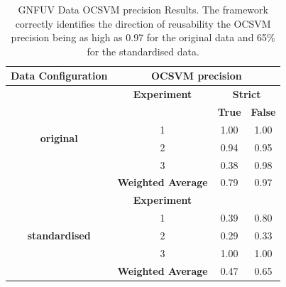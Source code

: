 \documentclass{mpaper}
\begin{document}
\begin{table}[]
\centering
\begin{tabular}{|c|ccc|}
\hline
\textbf{Data Configuration}            & \multicolumn{3}{c|}{\textbf{OCSVM precision}}                                         \\ \hline
\multirow{6}{*}{\textbf{original}}     & \multicolumn{1}{c|}{\textbf{Experiment}}       & \multicolumn{2}{c|}{\textbf{Strict}} \\ \cline{2-4} 
                                       & \multicolumn{1}{l|}{}                          & \textbf{True}    & \textbf{False}    \\ \cline{2-4} 
                                       & \multicolumn{1}{c|}{1}                         & 1.00             & 1.00              \\
                                       & \multicolumn{1}{c|}{2}                         & 0.94             & 0.95              \\
                                       & \multicolumn{1}{c|}{3}                         & 0.38             & 0.98              \\ \cline{2-4} 
                                       & \multicolumn{1}{c|}{\textbf{Weighted Average}} & 0.79             & 0.97              \\ \hline
\multirow{5}{*}{\textbf{standardised}} & \multicolumn{1}{c|}{\textbf{Experiment}}       &                  &                   \\ \cline{2-4} 
                                       & \multicolumn{1}{c|}{1}                         & 0.39             & 0.80              \\
                                       & \multicolumn{1}{c|}{2}                         & 0.29             & 0.33              \\
                                       & \multicolumn{1}{c|}{3}                         & 1.00             & 1.00              \\ \cline{2-4} 
                                       & \multicolumn{1}{c|}{\textbf{Weighted Average}} & 0.47             & 0.65              \\ \hline
\end{tabular}
\caption{\label{tab:gnfuv_ocsvm_precision} GNFUV Data OCSVM precision Results. The framework correctly identifies the direction of reusability the OCSVM precision being as high as 0.97 for the original data and 65\% for the standardised data.}
\end{table}
\end{document}
